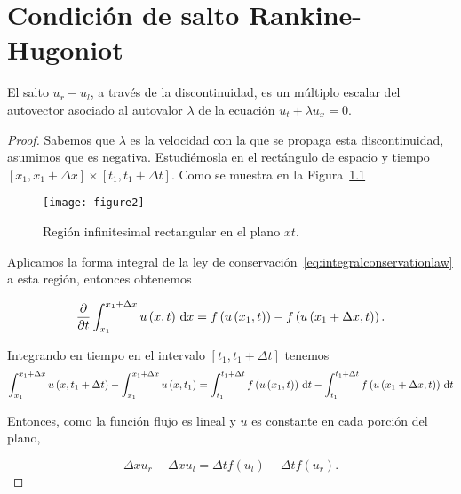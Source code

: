 \chapter{Condición de salto Rankine-Hugoniot}

\begin{theorem}
  El salto $u_{r}-u_{l}$, a través de la discontinuidad, es un
  múltiplo escalar del autovector asociado al autovalor $\lambda$ de
  la ecuación $u_{t}+\lambda u_{x}=0$.
\end{theorem}

\begin{proof}
  Sabemos que $\lambda$ es la velocidad con la que se propaga esta
  discontinuidad, asumimos que es negativa.
  Estudiémosla en el rectángulo de espacio y tiempo
  \begin{math}
    \left[x_{1},x_{1}+\Delta x\right]\times
    \left[t_{1},t_{1}+\Delta t\right]
  \end{math}.
  Como se muestra en la Figura~\ref{fig:2}

  \begin{figure}[ht!]
    \centering
    \texttt{[image: figure2]}
    \caption{Región infinitesimal rectangular en el plano $xt$.}
    \label{fig:2}
  \end{figure}

  Aplicamos la forma integral de la ley de
  conservación~\eqref{eq:integralconservationlaw} a esta región,
  entonces obtenemos

  \begin{equation*}
    \diffp{}{t}
    \int_{x_{1}}^{x_{1}+\Delta x}
    u\left(x,t\right)\dl x=
    f\left(u\left(x_{1},t\right)\right)-
    f\left(u\left(x_{1}+\Delta x,t\right)\right).
  \end{equation*}

  Integrando en tiempo en el intervalo
  $\left[t_{1},t_{1}+\Delta t\right]$ tenemos
  \begin{equation*}
    \int_{x_{1}}^{x_{1}+\Delta x}
    u\left(x,t_{1}+\Delta t\right)-
    \int_{x_{1}}^{x_{1}+\Delta x}
    u\left(x,t_{1}\right)=
    \int_{t_{1}}^{t_{1}+\Delta t}
    f\left(u\left(x_{1},t\right)\right)
    \dl t-
    \int_{t_{1}}^{t_{1}+\Delta t}
    f\left(u\left(x_{1}+\Delta x,t\right)\right)
    \dl t
  \end{equation*}

  Entonces, como la función flujo es lineal y $u$ es constante en
  cada porción del plano,

  \begin{equation}\label{eq:difference}
    \Delta x u_{r}-
    \Delta x u_{l}=
    \Delta t f\left(u_{l}\right)-
    \Delta t f\left(u_{r}\right).
  \end{equation}


\end{proof}
